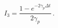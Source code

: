 \documentclass[]{scrartcl}
\begin{document}
	\begin{equation}
	\boxed{
	I_3 = \frac{1 - e^{-2\gamma_p \Delta t}}{2\gamma_p}\,.
	}
	\end{equation}
	






%
%



\end{document}
